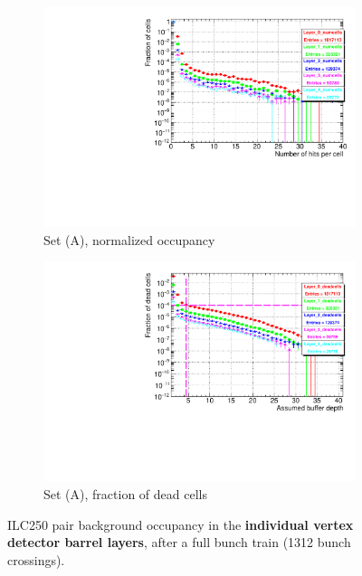    \begin{figure}
 \centering
  \begin{subfigure}[b]{0.49\textwidth}
   \centering
    \includegraphics[width=\textwidth]{Figures/Pairs/Appendix/occupancy_numcells_SiVertexBarrel_ILC250_SetA_corrected_Barrel_size.pdf}
   \caption{Set (A), normalized occupancy}
   \end{subfigure}
   \hfill
    \begin{subfigure}[b]{0.49\textwidth}
   \centering
    \includegraphics[width=\textwidth]{Figures/Pairs/Appendix/occupancy_deadcells_SiVertexBarrel_ILC250_SetA_corrected_Barrel_size.pdf}
   \caption{Set (A), fraction of dead cells}
   \end{subfigure}
   \caption[Pair background occupancy in the \sid vertex detector barrel layers for the ILC250 SetA]{ILC250 pair background occupancy in the \textbf{individual \sid vertex detector barrel layers}, after a full bunch train (\num{1312} bunch crossings).
}
\end{figure}
